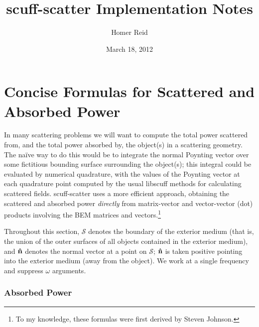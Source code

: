 \documentclass[letterpaper]{article}
\title {{\sc scuff-scatter} Implementation Notes}
\author {Homer Reid}
\date {March 18, 2012}
\begin{document}
\pagestyle{myheadings}
\maketitle

\tableofcontents

\newpage
\section{Concise Formulas for Scattered and Absorbed Power}

In many scattering problems we will want to compute the total
power scattered from, and the total power absorbed by, the
object(s) in a scattering geometry.  The na\"ive way to do 
this would be to integrate the normal Poynting vector over
some fictitious bounding surface surrounding the object(s);
this integral could be evaluated by numerical quadrature,
with the values of the Poynting vector at each quadrature
point computed by the usual {\sc libscuff} methods for
calculating scattered fields. {\sc scuff-scatter} uses a 
more efficient approach, obtaining the scattered and absorbed 
power \textit{directly} from matrix-vector and vector-vector 
(dot) products involving the BEM matrices and 
vectors.\footnote{To my knowledge, these formulas were first
derived by Steven Johnson.}

Throughout this section, $\mathcal{S}$ denotes the boundary
of the exterior medium (that is, the union of the outer surfaces
of all objects contained in the exterior medium), and 
$\mathbf{\hat n}$ denotes the normal vector at a point on 
$\mathcal{S}$; $\mathbf{\hat n}$ is taken positive pointing
into the exterior medium (away from the object).
We work at a single frequency and suppress $\omega$ arguments.

\subsubsection*{Absorbed Power}
\end{document}
